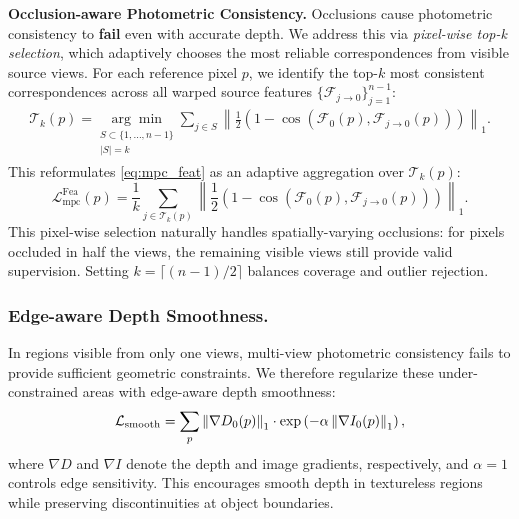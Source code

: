 \noindent\textbf{Occlusion-aware Photometric Consistency.}
Occlusions cause photometric consistency to \textbf{fail} even with accurate depth. 
We address this via \emph{pixel-wise top-k selection}, which adaptively chooses the most reliable correspondences from visible source views.
For each reference pixel $p$, we identify the top-$k$ most consistent correspondences across all warped source features $\{  \mathcal{F}_{j \rightarrow 0 }  \}_{j=1}^{n-1}$:
\begin{equation}
  \begin{aligned}
  \mathcal{T}_k(p) = \underset{\substack{S \subset \{1,\ldots,n-1\} \\ |S|=k}}{\arg\min} 
      \sum_{j \in S} \left\| \frac{1}{2}\left(1 - \cos(\mathcal{F}_{\text{0}}(p), \mathcal{F}_{j \rightarrow 0}(p))  \right) \right\|_1.
  \end{aligned}
  \end{equation}
This reformulates \cref{eq:mpc_feat} as an adaptive aggregation over $\mathcal{T}_k(p)$:
\begin{equation}
\label{eq:mpc_final}
\mathcal{L}_{\text{mpc}}^{\text{Fea}}(p) = \frac{1}{k} \sum_{j \in \mathcal{T}_k(p)} \left\| \frac{1}{2} \left(1 - \cos(\mathcal{F}_{\text{0}}(p), \mathcal{F}_{j \rightarrow 0}(p)) \right) \right\|_1.
\end{equation}
This pixel-wise selection naturally handles spatially-varying occlusions: for pixels occluded in half the views, the remaining visible views still provide valid supervision. 
Setting $k = \lceil (n-1)/2 \rceil$ balances coverage and outlier rejection.


\subsubsection{Edge-aware Depth Smoothness.}
\label{subsubsec:smooth}

In regions visible from only one views, multi-view photometric consistency fails to provide sufficient geometric constraints. 
We therefore regularize these under-constrained areas with edge-aware depth smoothness:
\begin{equation}
  \vspace{-0.2cm}
\label{eq:smooth}
\mathcal{L}_{\text{smooth}} = \sum_{p} \left\| \nabla D_{\text{0}}(p) \right\|_1 \cdot \exp\left( -\alpha \left\| \nabla I_{\text{0}}(p) \right\|_1 \right),
\end{equation}
where $\nabla D$ and $\nabla I$ denote the depth and image gradients, respectively, and $\alpha=1$ controls edge sensitivity. This encourages smooth depth in textureless regions while preserving discontinuities at object boundaries.

